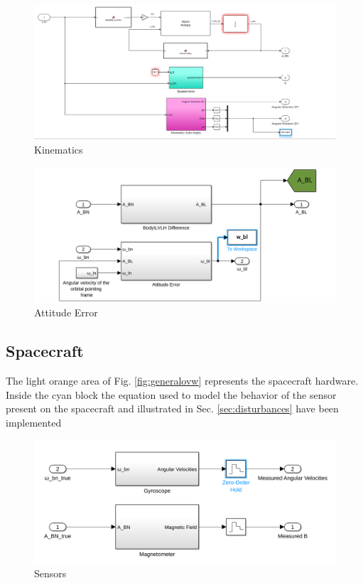\documentclass[11pt,a4paper]{report}
\begin{document}
\begin{figure}[H]
 \centering
 \includegraphics[scale=0.4]{gfx/simulink/kinematics.png}
 \caption{Kinematics} 
 \label{fig:kinematics}
\end{figure}

\begin{figure}[H]
 \centering
 \includegraphics[scale=0.4]{gfx/simulink/trueattitude.png}
 \caption{Attitude Error} 
 \label{fig:trueattitude}
\end{figure}

\subsection{Spacecraft}
The light orange area of Fig. \ref{fig:generalovw} represents the spacecraft hardware.
Inside the cyan block the equation used to model the behavior of the sensor present on the spacecraft and illustrated in Sec. \ref{sec:disturbances} have been implemented

\begin{figure}[H]
 \centering
 \includegraphics[scale=0.4]{gfx/simulink/sensors.png}
 \caption{Sensors} 
 \label{fig:sensors}
\end{figure}
\end{document}
